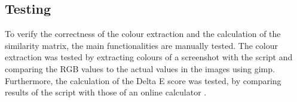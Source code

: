 


\newpage

\subsection{Testing}
\label{testing}
To verify the correctness of the colour extraction and the calculation of the similarity matrix, the main functionalities are manually tested. The colour extraction was tested by extracting colours of a screenshot with the script and comparing the RGB values to the actual values in the images using gimp. Furthermore, the calculation of the Delta E score was tested, by comparing results of the script with those of an online calculator \cite{Cie}. 

